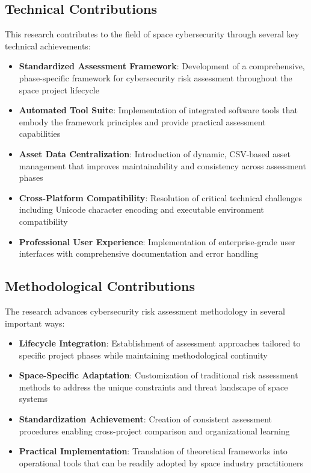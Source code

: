 \documentclass[binding=0.6cm]{sapthesis}
\begin{document}
\subsection{Technical Contributions}

This research contributes to the field of space cybersecurity through several key technical achievements:

\begin{itemize}
    \item \textbf{Standardized Assessment Framework}: Development of a comprehensive, phase-specific framework for cybersecurity risk assessment throughout the space project lifecycle
    \item \textbf{Automated Tool Suite}: Implementation of integrated software tools that embody the framework principles and provide practical assessment capabilities
    \item \textbf{Asset Data Centralization}: Introduction of dynamic, CSV-based asset management that improves maintainability and consistency across assessment phases
    \item \textbf{Cross-Platform Compatibility}: Resolution of critical technical challenges including Unicode character encoding and executable environment compatibility
    \item \textbf{Professional User Experience}: Implementation of enterprise-grade user interfaces with comprehensive documentation and error handling
\end{itemize}

\subsection{Methodological Contributions}

The research advances cybersecurity risk assessment methodology in several important ways:

\begin{itemize}
    \item \textbf{Lifecycle Integration}: Establishment of assessment approaches tailored to specific project phases while maintaining methodological continuity
    \item \textbf{Space-Specific Adaptation}: Customization of traditional risk assessment methods to address the unique constraints and threat landscape of space systems
    \item \textbf{Standardization Achievement}: Creation of consistent assessment procedures enabling cross-project comparison and organizational learning
    \item \textbf{Practical Implementation}: Translation of theoretical frameworks into operational tools that can be readily adopted by space industry practitioners
\end{itemize}
\end{document}
